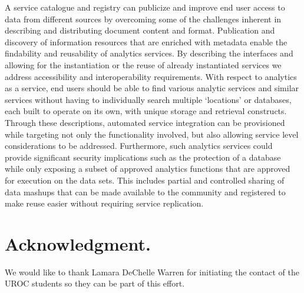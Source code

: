 \documentclass[A0,6pt]{article}
\begin{document}
\begin{multicols}{3}
A service catalogue and registry can publicize and improve end user access to data from different sources by overcoming some of the challenges inherent in describing and distributing document content and format. Publication and discovery of information resources that are enriched with metadata enable the findability and reusability of analytics services. By describing the interfaces and allowing for the instantiation or the reuse of already instantiated services we address accessibility and interoperability requirements. With respect to analytics as a service, end users should be able to find various analytic services and similar services without having to individually search multiple ‘locations’ or databases, each built to operate on its own, with unique storage and retrieval constructs. Through these descriptions, automated service integration can be provisioned while targeting not only the functionality involved, but also allowing service level considerations to be addressed. Furthermore, such analytics services could provide significant security implications such as the protection of a database while only exposing a subset of approved analytics functions that are approved for execution on the data sets. This includes partial and controlled sharing of data mashups that can be made available to the community and registered to make reuse easier without requiring service replication.

{\tiny
\section*{\footnotesize Acknowledgment.}

We would like to thank Lamara DeChelle Warren for initiating the contact of the UROC students so they can be part of this effort. 



}


\end{multicols}
\end{document}
